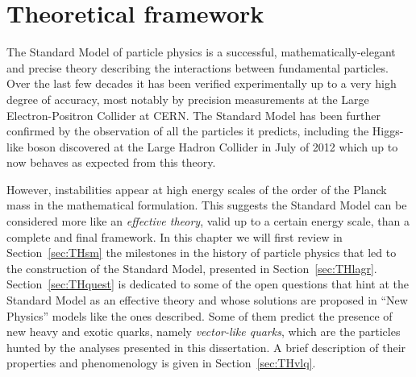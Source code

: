 \clearpage{\pagestyle{empty}\cleardoublepage}

\chapter{Theoretical framework}\label{chap:TH}

\vspace{-2.5cm}



\vspace{0.5cm}

The Standard Model of particle physics is a
successful, mathematically-elegant and precise 
theory describing the interactions
between fundamental particles. 
Over the last few decades it has been verified experimentally
up to a very high degree of accuracy, most notably by precision measurements 
at the Large Electron-Positron Collider at CERN.
The Standard Model has been further confirmed 
by the observation of all the particles it 
predicts, including the Higgs-like boson discovered at the
Large Hadron Collider in July of 2012 which up to now 
behaves as expected from this theory.

However, instabilities appear at high energy scales 
of the order of the Planck mass in the mathematical formulation.
This suggests the Standard Model can be considered 
more like an {\it effective theory}, 
valid up to a certain energy scale, than a complete and final framework.
In this chapter we will first review in Section~\ref{sec:THsm} the milestones
in the history of particle physics that led to the construction
of the Standard Model, presented in Section~\ref{sec:THlagr}.
Section~\ref{sec:THquest} is dedicated to some of the
open questions that hint at the Standard Model 
as an effective theory and whose solutions are proposed
in ``New Physics'' models like the ones described.
Some of them predict the presence of new heavy and exotic
quarks, namely {\it vector-like quarks}, which are
the particles hunted by the analyses presented in this dissertation.
A brief description of their properties and phenomenology is
given in Section~\ref{sec:THvlq}.






